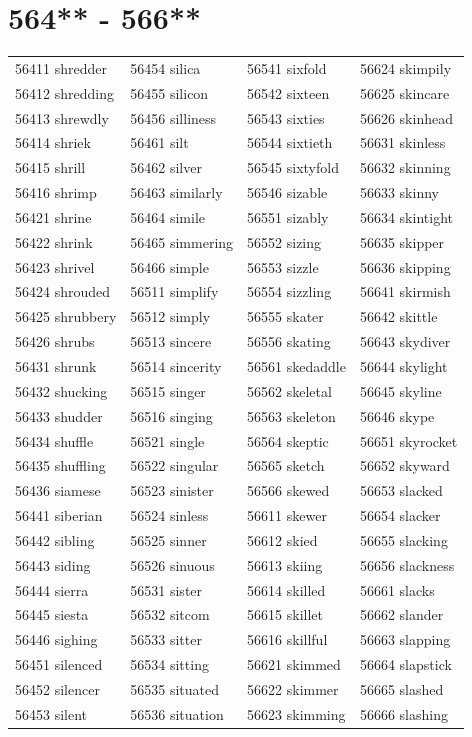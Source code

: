\documentclass[10pt, oneside]{book}
\begin{document}
\begin{table}
	\centering
	\section*{564** - 566**}
	\begin{tabular}{l l l l}
56411 shredder &56454 silica &56541 sixfold &56624 skimpily\\
56412 shredding &56455 silicon &56542 sixteen &56625 skincare\\
56413 shrewdly &56456 silliness &56543 sixties &56626 skinhead\\
56414 shriek &56461 silt &56544 sixtieth &56631 skinless\\
56415 shrill &56462 silver &56545 sixtyfold &56632 skinning\\
56416 shrimp &56463 similarly &56546 sizable &56633 skinny\\
56421 shrine &56464 simile &56551 sizably &56634 skintight\\
56422 shrink &56465 simmering &56552 sizing &56635 skipper\\
56423 shrivel &56466 simple &56553 sizzle &56636 skipping\\
56424 shrouded &56511 simplify &56554 sizzling &56641 skirmish\\
56425 shrubbery &56512 simply &56555 skater &56642 skittle\\
56426 shrubs &56513 sincere &56556 skating &56643 skydiver\\
56431 shrunk &56514 sincerity &56561 skedaddle &56644 skylight\\
56432 shucking &56515 singer &56562 skeletal &56645 skyline\\
56433 shudder &56516 singing &56563 skeleton &56646 skype\\
56434 shuffle &56521 single &56564 skeptic &56651 skyrocket\\
56435 shuffling &56522 singular &56565 sketch &56652 skyward\\
56436 siamese &56523 sinister &56566 skewed &56653 slacked\\
56441 siberian &56524 sinless &56611 skewer &56654 slacker\\
56442 sibling &56525 sinner &56612 skied &56655 slacking\\
56443 siding &56526 sinuous &56613 skiing &56656 slackness\\
56444 sierra &56531 sister &56614 skilled &56661 slacks\\
56445 siesta &56532 sitcom &56615 skillet &56662 slander\\
56446 sighing &56533 sitter &56616 skillful &56663 slapping\\
56451 silenced &56534 sitting &56621 skimmed &56664 slapstick\\
56452 silencer &56535 situated &56622 skimmer &56665 slashed\\
56453 silent &56536 situation &56623 skimming &56666 slashing\\
	\end{tabular}
 \end{table}
\clearpage
\end{document}
